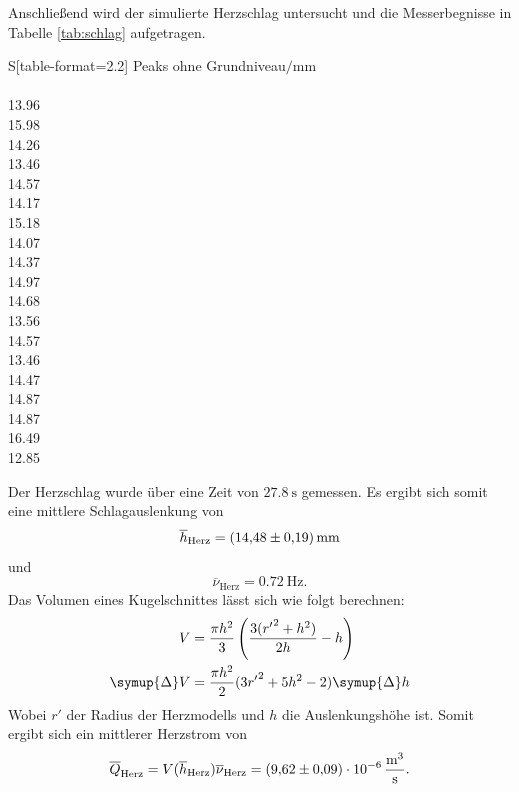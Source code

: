 Anschließend wird der simulierte Herzschlag untersucht und die Messerbegnisse in Tabelle \ref{tab:schlag} aufgetragen.
\begin{table}[H]
    \caption{Messung des Herzschlags.}
    \label{tab:schlag}
    \centering
    \begin{tabular}{S[table-format=2.2]}
        \toprule
        {Peaks ohne Grundniveau$/\si{\milli\meter}$} \\
         \\
            13.96 \\
            15.98 \\
            14.26 \\
            13.46 \\
            14.57 \\
            14.17 \\
            15.18 \\
            14.07 \\
            14.37 \\
            14.97 \\
            14.68 \\
            13.56 \\
            14.57 \\
            13.46 \\
            14.47 \\
            14.87 \\
            14.87 \\
            16.49 \\
            12.85 \\
        \bottomrule
    \end{tabular}
\end{table}
\noindent

Der Herzschlag wurde über eine Zeit von $\SI{27.8}{\second}$ gemessen.
Es ergibt sich somit eine mittlere Schlagauslenkung von
\begin{equation}
   \overline{h}_\text{Herz} = \SI{14.48\pm0.19}{\milli\meter}
\end{equation}
und
\begin{equation}
   \overline{\nu}_\text{Herz} = \SI{0.72}{\hertz}.
\end{equation}
Das Volumen eines Kugelschnittes lässt sich wie folgt berechnen:
\begin{align}
    V &= \frac{\pi h^2}{3}\left( \frac{3({r'}^2+h^2)}{2h} - h \right) \\
    \symup{\Delta}V &= \frac{\pi h^2}{2}(3{r'}^2+5h^2-2)\symup{\Delta}h
\end{align}
Wobei $r'$ der Radius der Herzmodells und $h$ die Auslenkungshöhe ist.
Somit ergibt sich ein mittlerer Herzstrom von
\begin{equation}
   \overline{Q}_\text{Herz} = V(\overline{h}_\text{Herz})\overline{\nu}_\text{Herz} = \SI{9.62\pm0.09e-6}{\meter\cubed\per\second}.
\end{equation}
